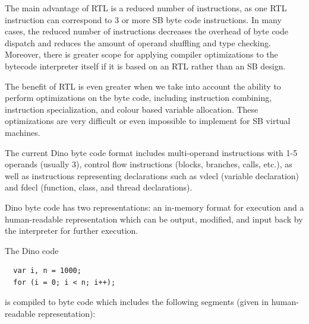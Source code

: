 \documentclass[preprint]{sigplanconf}
\begin{document}
  The main advantage of RTL is a reduced number of instructions, as one RTL instruction can correspond to 3 or more SB
byte code instructions. In many cases, the reduced number of instructions decreases 
the overhead of byte code dispatch and reduces the amount of operand shuffling and
type checking. Moreover, there is greater scope for 
applying compiler optimizations to the bytecode interpreter itself
if it is based on an RTL rather than an SB design.

  The benefit of RTL is even greater when we take into account the ability to
perform optimizations on the byte code, including instruction combining, instruction specialization, and colour based variable allocation. These optimizations are
very difficult or even impossible to implement for SB virtual machines.

  The current Dino byte code format includes multi-operand instructions
with 1-5 operands (usually 3), control flow instructions (blocks, branches, calls, etc.),
as well as instructions representing declarations such as vdecl (variable declaration)
and fdecl (function, class, and thread declarations).

  Dino byte code has two representations: an in-memory format for execution
and a human-readable representation which can be output, modified, and input
back by the interpreter for further execution.

  The Dino code

{\footnotesize
\begin{verbatim}
  var i, n = 1000;
  for (i = 0; i < n; i++);
\end{verbatim}
}

  is compiled to byte code which includes the following segments (given in human-readable representation):
 
\end{document}
